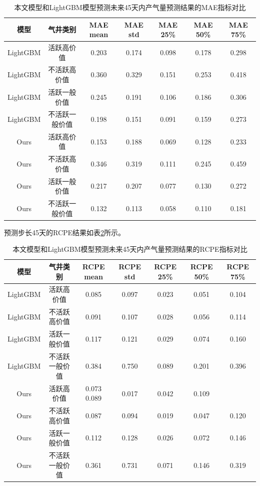 \begin{table}[H]
    \renewcommand{\arraystretch}{1.5}
    \centering
    \caption{本文模型和LightGBM模型预测未来45天内产气量预测结果的MAE指标对比}
    \label{tab:MAE45}
    \begin{tabular}{|c|c|c|c|c|c|c|}
    \hline
    模型       & 气井类别 & MAE mean & MAE std & MAE 25\% & MAE 50\% & MAE 75\% \\ \hline
    LightGBM  & 活跃高价值        & 0.203   & 0.174    &0.098    & 0.178     & 0.298 \\ \hline
    LightGBM  & 不活跃高价值      & 0.360    & 0.329   & 0.151    & 0.253    & 0.418    \\ \hline
    LightGBM  & 活跃一般价值     & 0.245    & 0.191   & 0.106    & 0.186    & 0.306    \\ \hline
    LightGBM  & 不活跃一般价值      & 0.198    & 0.151   & 0.091    & 0.159    & 0.273    \\ \hline
    Ours       & 活跃高价值        &0.153     & 0.188   & 0.069     & 0.128   & 0.233   \\ \hline
    Ours       & 不活跃高价值      & 0.346    & 0.319   & 0.111    & 0.245    & 0.459    \\ \hline
    Ours       & 活跃一般价值     & 0.217    & 0.207   & 0.077    & 0.130    & 0.272    \\ \hline
    Ours       & 不活跃一般价值      & 0.132    & 0.113   & 0.058    & 0.110    & 0.181    \\ \hline
    \end{tabular}
\end{table}
预测步长45天的RCPE结果如表\ref{tab:RCPE45}所示。 
\begin{table}[H]
    \renewcommand{\arraystretch}{1.5}
    \centering
    \caption{本文模型和LightGBM模型预测未来45天内产气量预测结果的RCPE指标对比}
    \label{tab:RCPE45}
    \begin{tabular}{|c|c|c|c|c|c|c|}
    \hline
    模型       & 气井类别 & RCPE mean & RCPE std & RCPE 25\% & RCPE 50\% & RCPE 75\% \\ \hline
    LightGBM  & 活跃高价值       & 0.085      &0.097    &0.023      &0.051      & 0.104 \\ \hline
    LightGBM  & 不活跃高价值      & 0.091     & 0.107    & 0.028     & 0.056     & 0.114     \\ \hline
    LightGBM  & 活跃一般价值     & 0.117     & 0.121    & 0.029     & 0.074     & 0.160     \\ \hline
    LightGBM  & 不活跃一般价值      & 0.384     & 0.750    & 0.089     & 0.201     & 0.396     \\ \hline
    Ours       &活跃高价值          & 0.073    0.089      & 0.017     & 0.042     & 0.109 \\ \hline
    Ours       & 不活跃高价值      & 0.087     & 0.094    & 0.019     & 0.047     & 0.120     \\ \hline
    Ours       & 活跃一般价值     & 0.112     & 0.128    & 0.026     & 0.072     & 0.146     \\ \hline
    Ours       & 不活跃一般价值      & 0.361     & 0.731    & 0.071     & 0.146     & 0.319     \\ \hline
    \end{tabular}
\end{table}
